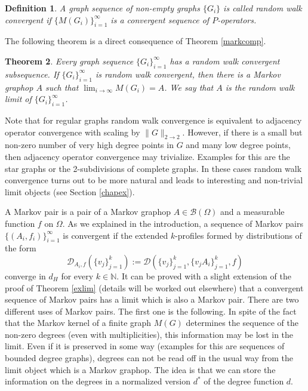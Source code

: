 \documentclass[a4wider]{amsart}
\newtheorem{theorem}{Theorem}[section]
\newtheorem{definition}[theorem]{Definition}
\theoremstyle{definitionbreak}\newtheorem{D}[theorem]{Definition}
\theoremstyle{definitionbreak}\newtheorem*{D*}{Definition}
\begin{document}
\begin{definition} A graph sequence of non-empty graphs $\{G_i\}$ is called  random walk convergent if $\{M(G_i)\}_{i=1}^\infty$ is a convergent sequence of $P$-operators. 
\end{definition}

The following theorem is a direct consequence of Theorem \ref{markcomp}. 

\begin{theorem} Every graph sequence $\{G_i\}_{i=1}^\infty$ has a random walk convergent subsequence. If $\{G_i\}_{i=1}^\infty$ is random walk convergent, then there is a Markov graphop $A$ such that $\lim_{i\to \infty} M(G_i)=A$. We say that $A$ is the random walk limit of $\{G_i\}_{i=1}^\infty$.
\end{theorem}

Note that for regular graphs random walk convergence is equivalent to  adjacency operator convergence with scaling by $\|G\|_{2\to 2}$. However, if there is a small but non-zero number of very high degree points in $G$ and many low degree points, then adjacency operator convergence may trivialize. Examples for this are the star graphs or the 2-subdivisions of complete graphs. In these cases random walk convergence turns out to be more natural and leads to interesting and non-trivial limit objects (see Section \ref{chapex}).

 A Markov pair is a pair of a Markov graphop $A\in\mathcal{B}(\Omega)$ and a measurable function $f$ on $\Omega$. As we explained in the introduction, a sequence of Markov pairs $\{(A_i,f_i)\}_{i=1}^\infty$ is convergent if the extended $k$-profiles formed by distributions of the form
$$\mathcal{D}_{A_i,f}(\{v_j\}_{j=1}^k):=\mathcal{D}(\{v_j\}_{j=1}^k,\{v_jA_i\}_{j=1}^k,f)$$ converge in $d_H$ for every $k\in\mathbb{N}$. It can be proved with a slight extension of the proof of Theorem \ref{exlim} (details will be worked out elsewhere) that a convergent sequence of Markov pairs has a limit which is also a Markov pair. There are two different uses of Markov pairs. The first one is the following. In spite of the fact that the Markov kernel of a finite graph $M(G)$ determines the sequence of the non-zero degrees (even with multiplicities), this information may be lost in the limit. Even if it is preserved in some way (examples for this are sequences of bounded degree graphs), degrees can not be read off in the usual way from the limit object which is a Markov graphop. The idea is that we can store the information on the degrees in a normalized version $d^*$ of the degree function $d$. 
\end{document}
